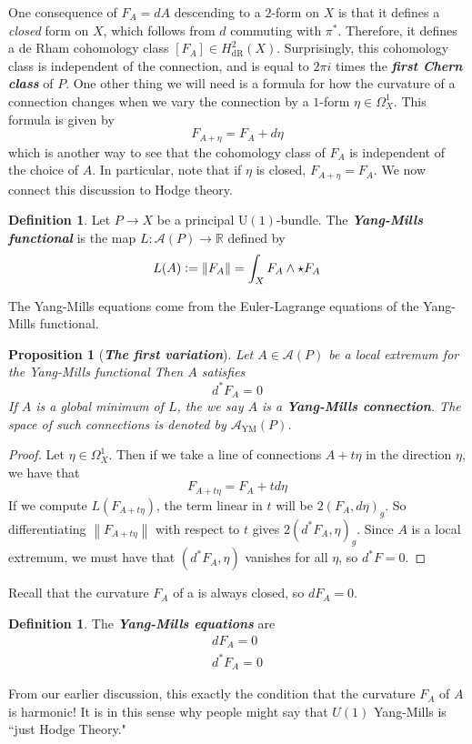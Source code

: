 \documentclass[psamsfonts, 12pt]{amsart}
\newtheorem{prop}[thm]{Proposition}
\theoremstyle{definition}
\newtheorem{defn}[thm]{Definition}
\theoremstyle{remark}
\newcommand{\R}{\mathbb{R}}
\newcommand{\ib}[1]{\textbf{\textit{#1}}}
\newcommand{\norm}[1]{\left\lVert#1\right\rVert}
\newcommand{\defeq}{\vcentcolon=}
\begin{document}
One consequence of $F_A = dA$ descending to a $2$-form on $X$ is that it defines
a \emph{closed} form on $X$, which follows from $d$ commuting with $\pi^*$. Therefore,
it defines a de Rham cohomology class $[F_A] \in H^2_{\mathrm{dR}}(X)$. Surprisingly,
this cohomology class is independent of the connection, and is equal
to $2\pi i$ times the \ib{first Chern class} of $P$. One other thing we will need is a
formula for how the curvature of a connection changes when we vary the connection by a
$1$-form $\eta \in \Omega^1_X$. This formula is given by
\[
F_{A+\eta} = F_A + d\eta
\]
which is another way to see that the cohomology class of $F_A$ is independent
of the choice of $A$. In particular, note that if $\eta$ is closed, $F_{A+\eta} = F_A$.
We now connect this discussion to Hodge theory.
%
\begin{defn}
Let $P \to X$ be a principal $\mathrm{U}(1)$-bundle. The \ib{Yang-Mills functional}
is the map $L : \mathscr{A}(P) \to \R$ defined by
\[
L(A) \defeq \norm{F_A} = \int_X F_A \wedge \star F_A
\]
\end{defn}
%
The Yang-Mills equations come from the Euler-Lagrange equations of the Yang-Mills
functional.
%
\begin{prop}[\ib{The first variation}]
Let $A \in \mathscr{A}(P)$ be a local extremum for the Yang-Mills functional
Then $A$ satisfies
\[
d^*F_A = 0
\]
If $A$ is a \emph{global} minimum of $L$, the we say $A$ is a \ib{Yang-Mills connection}.
The space of such connections is denoted by $\mathscr{A}_{\mathrm{YM}}(P)$.
\end{prop}
%
\begin{proof}
Let $\eta \in \Omega^1_X$. Then if we take a line of connections $A + t\eta$ in
the direction $\eta$, we have that
\[
F_{A+t\eta} = F_A + td\eta
\]
If we compute $L(F_{A+t\eta})$, the term linear in $t$ will be $2(F_A,d\eta)_g$.
So differentiating $\norm{F_{A+t\eta}}$ with respect to $t$ gives $2(d^*F_A,\eta)_g$.
Since $A$ is a local extremum, we must have that $(d^*F_A,\eta)$ vanishes
for all $\eta$, so $d^*F = 0$.
\end{proof}
%
Recall that the curvature $F_A$ of a is always closed, so $dF_A = 0$.
%
\begin{defn}
The \ib{Yang-Mills equations} are
\begin{align*}
dF_A = 0 \\
d^*F_A = 0
\end{align*}
\end{defn}
%
From our earlier discussion, this exactly the condition that the curvature $F_A$
of $A$ is harmonic! It is in this sense why people might say that $U(1)$ Yang-Mills
is ``just Hodge Theory." \\
\end{document}
